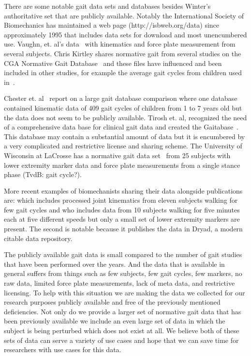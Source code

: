 \documentclass[10pt,a4paper,twocolumn]{article}
\begin{document}
There are some notable gait data sets and databases besides Winter's authoritative
set that are publicly available. Notably the International Society of
Biomechanics has maintained a web page (http://isbweb.org/data) since
approximately 1995 that includes data sets for download and most unencumbered
use. Vaughn, et. al's data~\cite{Vaughan1992} with kinematics and force plate
measurement from several subjects. Chris Kirtley shares normative gait from
several studies on the CGA Normative Gait Database~\cite{Kirtley} and these
files have influenced and been included in other studies, for
example the average gait cycles from children used in~\cite{Bogert2003}.

Chester et. al~\cite{Chester2007} report on a large gait database comparison
where one database contained kinematic data of 409 gait cycles of children from
1 to 7 years old but the data does not seem to be publicly available. Tirosh
et. al, recognized the need of a comprehensive data base for clinical gait data
and created the Gaitabase~\cite{Tirosh2010}.  This database may contain a
substantial amount of data but it is encumbered by a very complicated and
restrictive license and sharing scheme. The University of Wisconsin at LaCrosse
has a normative gait data set~\cite{Wilson} from 25 subjects with lower
extremity marker data and force plate measurements from a single stance phase (TvdB: gait cycle?).

More recent examples of biomechanists sharing their data alongside
publications are: \cite{Bogert2013} which includes processed joint kinematics
from eleven subjects walking for few gait cycles and \cite{Wang2014} who
includes data from 10 subjects walking for five minutes each at five different
speeds but only a small set of lower extremity markers are present. The second
is notable because it publishes the data in Dryad, a modern citable data
repository.

The publicly available gait data is small compared to the number of gait
studies that have been performed over the years. And the data that is available
in general suffers from things such as few subjects, few gait cycles, few
markers, no raw data, limited force plate measurements, lack of meta data, and
restrictive licensing. To help with this situation we are making the data we
collected for our research purposes publicly available and free of the
previously mentioned deficiencies. Not only do we provide a larger set of
normative gait data that has been previously available we include an even large
set of data in which the subject is being perturbed which does not exist at
all. We believe both of these sets of data can serve a variety of use cases and
hope that we can save time for researchers with use cases for this data.
\end{document}
